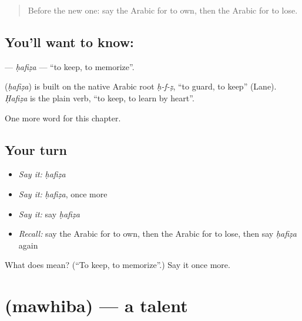 \label{lesson:AR-C110-hafiza}



\begin{quote}
Before the new one: say the Arabic for to own, then the Arabic for to lose.
\end{quote}

\subsection*{You'll want to know: }
\textbf{} — \emph{ḥafiẓa} — \textquotedblleft{}to keep, to memorize\textquotedblright{}.

\begin{cousinweb}
\textbf{} (\emph{ḥafiẓa}) is built on the native Arabic root \emph{ḥ-f-ẓ}, \textquotedblleft{}to guard, to keep\textquotedblright{} (Lane). \emph{Ḥafiẓa} is the plain verb, \textquotedblleft{}to keep, to learn by heart\textquotedblright{}.
\end{cousinweb}

\begin{grammarlens}[title={What you've built}]
One more word for this chapter.
\end{grammarlens}

\subsection*{Your turn}
\begin{itemize}
\raggedright
  \item \emph{Say it:} \emph{ḥafiẓa}
  \item \emph{Say it:} \emph{ḥafiẓa}, once more
  \item \emph{Say it:} say \emph{ḥafiẓa}
  \item \emph{Recall:} say the Arabic for to own, then the Arabic for to lose, then say \emph{ḥafiẓa} again
\end{itemize}

\begin{tcolorbox}[breakable,colback=teal!4,colframe=teal!35!black,title={Before you move on}]
What does  mean? (\textquotedblleft{}To keep, to memorize\textquotedblright{}.) Say it once more.
\end{tcolorbox}
\section[\texorpdfstring{\ar{موهبة} (mawhiba)}{موهبة (mawhiba)}]{ (mawhiba) — a talent}

